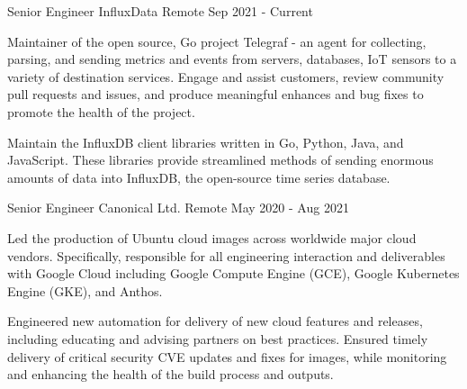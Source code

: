 

\begin{cventries}

  \cventry
    {Senior Engineer}
    {InfluxData}
    {Remote}
    {Sep 2021 - Current}
    {
      \begin{cvitems}
        \item {
          Maintainer of the open source, Go project Telegraf - an agent for
          collecting, parsing, and sending metrics and events from servers,
          databases, IoT sensors to a variety of destination services. Engage
          and assist customers, review community pull requests and issues, and
          produce meaningful enhances and bug fixes to promote the health of the
          project.
        }
        \item {
          Maintain the InfluxDB client libraries written in Go, Python, Java,
          and JavaScript. These libraries provide streamlined methods of sending
          enormous amounts of data into InfluxDB, the open-source time series
          database.
        }
      \end{cvitems}
    }
    {}

  \cventry
    {Senior Engineer}
    {Canonical Ltd.}
    {Remote}
    {May 2020 - Aug 2021}
    {
      \begin{cvitems}
        \item {
          Led the production of Ubuntu cloud images across worldwide major
          cloud vendors. Specifically, responsible for all engineering
          interaction and deliverables with Google Cloud including Google
          Compute Engine (GCE), Google Kubernetes Engine (GKE), and Anthos.
        }
        \item {
          Engineered new automation for delivery of new cloud features and
          releases, including educating and advising partners on best
          practices. Ensured timely delivery of critical security CVE updates
          and fixes for images, while monitoring and enhancing the health of the
          build process and outputs.
        }
      \end{cvitems}
    }
    {}


\end{cventries}
